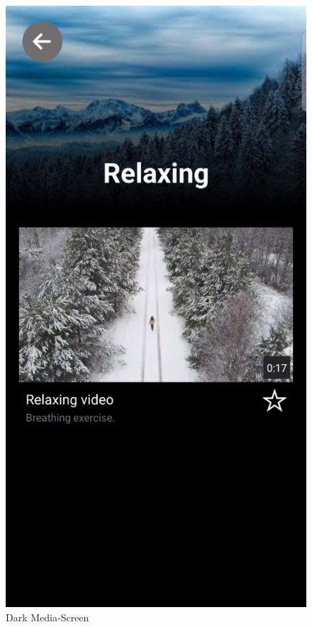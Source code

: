 \begin{figure}[H]
    \begin{minipage}{0.5\textwidth}
        \centering
        \includegraphics[height=1.4\textwidth]{./pics/dMedia.jpg}
        \caption{Dark Media-Screen}
    \end{minipage}
    \begin{minipage}{0.5\textwidth}
        \centering

\end{minipage}
\end{figure}
